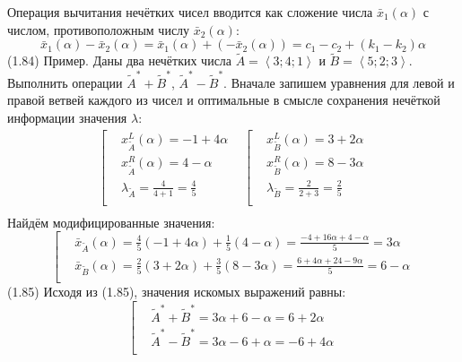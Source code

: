 Операция вычитания нечётких чисел вводится как сложение числа $\bar{x}_1\left( \alpha  \right)$ с числом, противоположным числу $\bar{x}_2\left( \alpha  \right)$:
	\[{{\bar{x}}_{1}}\left( \alpha  \right)-{{\bar{x}}_{2}}\left( \alpha  \right)={{\bar{x}}_{1}}\left( \alpha  \right)+\left( -{{{\bar{x}}}_{2}}\left( \alpha  \right) \right)={{c}_{1}}-{{c}_{2}}+\left( {{k}_{1}}-{{k}_{2}} \right)\alpha \] 	(1.84)
Пример. Даны два нечётких числа $\tilde{A}=\left\langle 3;4;1 \right\rangle $ и $\tilde{B}=\left\langle 5;2;3 \right\rangle $. Выполнить операции ${{\tilde{A}}^{*}}+{{\tilde{B}}^{*}}$, ${{\tilde{A}}^{*}}-{{\tilde{B}}^{*}}$.
Вначале запишем уравнения для левой и правой ветвей каждого из чисел и оптимальные в смысле сохранения нечёткой информации значения $\lambda $:
	\[\begin{matrix}
   \left[ \begin{aligned}
  & x_{{\tilde{A}}}^{L}\left( \alpha  \right)=-1+4\alpha  \\ 
 & x_{{\tilde{A}}}^{R}\left( \alpha  \right)=4-\alpha  \\ 
 & {{\lambda }_{{\tilde{A}}}}=\frac{4}{4+1}=\frac{4}{5} \\ 
\end{aligned} \right. & \left[ \begin{aligned}
  & x_{{\tilde{B}}}^{L}\left( \alpha  \right)=3+2\alpha  \\ 
 & x_{{\tilde{B}}}^{R}\left( \alpha  \right)=8-3\alpha  \\ 
 & {{\lambda }_{{\tilde{B}}}}=\frac{2}{2+3}=\frac{2}{5} \\ 
\end{aligned} \right.  \\
\end{matrix}\] 
Найдём модифицированные значения:
	\[\left[ \begin{aligned}
  & {{{\bar{x}}}_{{\tilde{A}}}}\left( \alpha  \right)=\frac{4}{5}\left( -1+4\alpha  \right)+\frac{1}{5}\left( 4-\alpha  \right)=\frac{-4+16\alpha +4-\alpha }{5}=3\alpha  \\ 
 & {{{\bar{x}}}_{{\tilde{B}}}}\left( \alpha  \right)=\frac{2}{5}\left( 3+2\alpha  \right)+\frac{3}{5}\left( 8-3\alpha  \right)=\frac{6+4\alpha +24-9\alpha }{5}=6-\alpha  \\ 
\end{aligned} \right.\] 	(1.85)
Исходя из (1.85), значения искомых выражений равны:
	\[\left[ \begin{aligned}
  & {{{\tilde{A}}}^{*}}+{{{\tilde{B}}}^{*}}=3\alpha +6-\alpha =6+2\alpha  \\ 
 & {{{\tilde{A}}}^{*}}-{{{\tilde{B}}}^{*}}=3\alpha -6+\alpha =-6+4\alpha  \\ 
\end{aligned} \right.\] 
